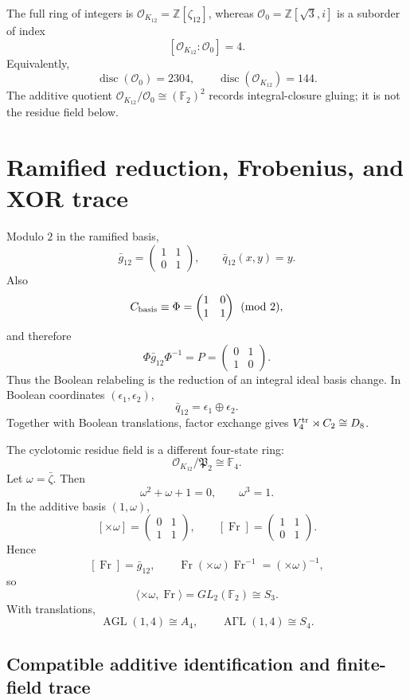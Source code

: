 \documentclass[11pt]{article}
\theoremstyle{remark}
\newcommand{\Z}{\mathbb Z}
\newcommand{\F}{\mathbb F}
\newcommand{\OO}{\mathcal O}
\newcommand{\disc}{\operatorname{disc}}
\newcommand{\Fr}{\operatorname{Fr}}
\begin{document}
The full ring of integers is $\OO_{K_{12}}=\Z[\zeta_{12}]$, whereas
$\OO_0=\Z[\sqrt3,i]$ is a suborder of index
\[
\boxed{[\OO_{K_{12}}:\OO_0]=4.}
\]
Equivalently,
\[
\disc(\OO_0)=2304,
\qquad \disc(\OO_{K_{12}})=144.
\]
The additive quotient $\OO_{K_{12}}/\OO_0\cong(\F_2)^2$ records
integral-closure gluing; it is not the residue field below.

\section{Ramified reduction, Frobenius, and XOR trace}

Modulo $2$ in the ramified basis,
\[
\bar g_{12}
=\begin{pmatrix}1&1\\0&1\end{pmatrix},
\qquad
\bar q_{12}(x,y)=y.
\]
Also
\[
C_{\rm basis}\equiv
\Phi=\begin{pmatrix}1&0\\1&1\end{pmatrix}\pmod2,
\]
and therefore
\[
\Phi\bar g_{12}\Phi^{-1}
=P=\begin{pmatrix}0&1\\1&0\end{pmatrix}.
\]
Thus the Boolean relabeling is the reduction of an integral ideal basis
change.  In Boolean coordinates $(\epsilon_1,\epsilon_2)$,
\[
\bar q_{12}=\epsilon_1\oplus\epsilon_2.
\]
Together with Boolean translations, factor exchange gives
$V_4^{\rm tr}\rtimes C_2\cong D_8$.

The cyclotomic residue field is a different four-state ring:
\[
\boxed{\OO_{K_{12}}/\mathfrak P_2\cong\F_4.}
\]
Let $\omega=\bar\zeta$.  Then
\[
\omega^2+\omega+1=0,
\qquad \omega^3=1.
\]
In the additive basis $(1,\omega)$,
\[
[\times\omega]=\begin{pmatrix}0&1\\1&1\end{pmatrix},
\qquad
[\Fr]=\begin{pmatrix}1&1\\0&1\end{pmatrix}.
\]
Hence
\[
\boxed{[\Fr]=\bar g_{12}},
\qquad
\Fr(\times\omega)\Fr^{-1}=(\times\omega)^{-1},
\]
so
\[
\langle\times\omega,\Fr\rangle
=GL_2(\F_2)\cong S_3.
\]
With translations,
\[
\operatorname{AGL}(1,4)\cong A_4,
\qquad
\operatorname{A\Gamma L}(1,4)\cong S_4.
\]

\subsection{Compatible additive identification and finite-field trace}
\end{document}

